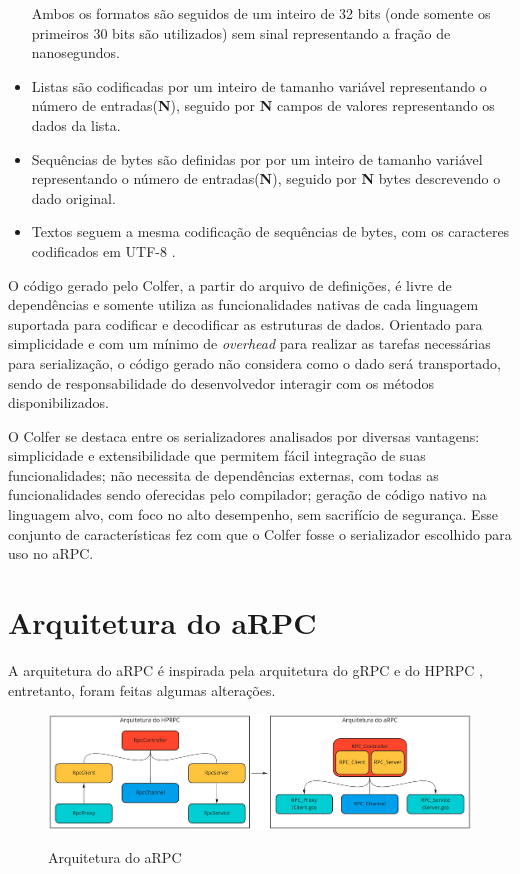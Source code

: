 \begin{itemize}
Ambos os formatos são seguidos de um inteiro de 32 bits (onde somente os primeiros 30 bits são utilizados) sem sinal representando a fração de nanosegundos.

    \item Listas são codificadas por um inteiro de tamanho variável representando o número de entradas(\textbf{N}), seguido por \textbf{N} campos de valores representando os dados da lista.

    \item Sequências de bytes são definidas por por um inteiro de tamanho variável representando o número de entradas(\textbf{N}), seguido por \textbf{N} bytes descrevendo o dado original.

    \item Textos seguem a mesma codificação de sequências de bytes, com os caracteres codificados em UTF-8 \cite{noauthor_unicode_2010}.

\end{itemize}

O código gerado pelo Colfer, a partir do arquivo de definições, é livre de dependências e somente utiliza as funcionalidades nativas de cada linguagem suportada para codificar e decodificar as estruturas de dados.
Orientado para simplicidade e com um mínimo de \textit{overhead} para realizar as tarefas necessárias para serialização, o código gerado não considera como o dado será transportado, sendo de responsabilidade do desenvolvedor interagir com os métodos disponibilizados. 

O Colfer se destaca entre os serializadores analisados por diversas vantagens: simplicidade e extensibilidade que permitem fácil integração de suas funcionalidades; não necessita de dependências externas, com todas as funcionalidades sendo oferecidas pelo compilador; geração de código nativo na linguagem alvo, com foco no alto desempenho, sem sacrifício de segurança. Esse conjunto de características fez com que o Colfer fosse o serializador escolhido para uso no aRPC.

\section{Arquitetura do aRPC}

A arquitetura do aRPC é inspirada pela arquitetura do gRPC e do HPRPC \cite{bagci_lightweight_2016}, entretanto, foram feitas algumas alterações. 

\begin{figure}[ht]
    \centering
    \caption{Arquitetura do aRPC}
    \includegraphics[width=\textwidth]{figuras/diagramas/cap3/arquitetura.png} 
    \label{fig:arpc_arquitetura}
\end{figure}

